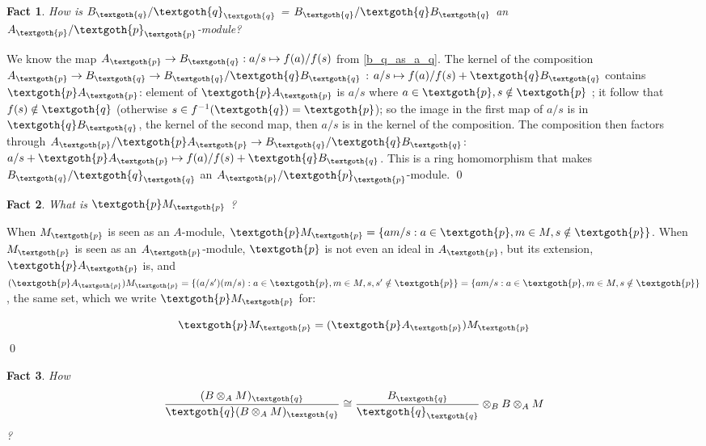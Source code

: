 \documentclass{article}
\newtheorem{theorem}{Fact}[section]
\begin{document}
\begin{theorem}
How is $B_\textgoth{q} / \textgoth{q}_\textgoth{q}$ = $B_\textgoth{q}/\textgoth{q}B_\textgoth{q}$ an $A_\textgoth{p} / \textgoth{p}_\textgoth{p}$-module?
\end{theorem}

\noindent
We know the map $A_\textgoth{p} \rightarrow B_\textgoth{q} : a/s \mapsto f(a)/f(s)$ from \ref{b_q_as_a_q}.
The kernel of the composition $A_\textgoth{p} \rightarrow B_\textgoth{q} \rightarrow B_\textgoth{q} / \textgoth{q} B_\textgoth{q}$ : $a/s \mapsto f(a)/f(s) + \textgoth{q} B_\textgoth{q}$ contains $\textgoth{p} A_\textgoth{p}$: 
element of $\textgoth{p}A_\textgoth{p}$ is $a/s$ where $a \in \textgoth{p}, s \notin \textgoth{p}$ ; it follow that $f(s) \notin \textgoth{q}$ (otherwise $s \in f^{-1}(\textgoth{q}) = \textgoth{p}$); so the image in the first map of $a/s$ is in $\textgoth{q}B_\textgoth{q}$, the kernel of the second map, then $a/s$ is in the kernel of the composition.
The composition then factors through $A_\textgoth{p} / \textgoth{p} A_\textgoth{p} \rightarrow B_\textgoth{q} / \textgoth{q} B_\textgoth{q}$: $a/s + \textgoth{p} A_\textgoth{p} \mapsto f(a)/f(s) + \textgoth{q} B_\textgoth{q}$. This is a ring homomorphism that makes $B_\textgoth{q} / \textgoth{q}_\textgoth{q}$ an $A_\textgoth{p} / \textgoth{p}_\textgoth{p}$-module.
\qed

\begin{theorem}

What is $\textgoth{p} M_\textgoth{p}$ ?
\end{theorem}

\noindent
When $M_\textgoth{p}$ is seen as an $A$-module, $\textgoth{p} M_\textgoth{p} = \{am/s: a \in \textgoth{p}, m \in M, s \notin \textgoth{p} \}$. When $M_\textgoth{p}$ is seen as an $A_\textgoth{p}$-module, $\textgoth{p}$ is not even an ideal in $A_\textgoth{p}$, but its extension, $\textgoth{p} A_\textgoth{p}$ is, and $(\textgoth{p} A_\textgoth{p}) M_\textgoth{p} = \{(a/s')(m/s): a \in \textgoth{p}, m \in M, s, s' \notin \textgoth{p} \} = \{am/s: a \in \textgoth{p}, m \in M, s \notin \textgoth{p} \}$, the same set, which we write $\textgoth{p} M_\textgoth{p}$ for:

\[
  \textgoth{p} M_\textgoth{p} = (\textgoth{p} A_\textgoth{p}) M_\textgoth{p}
\]
\qed

\begin{theorem}
How
\[
\frac{(B \otimes_A M)_\textgoth{q}}{\textgoth{q} (B \otimes_A M)_\textgoth{q}} 
\cong
\frac{B_\textgoth{q}}{\textgoth{q}_\textgoth{q}} \otimes_B B \otimes_A M
\]
?
\end{theorem}
\end{document}
